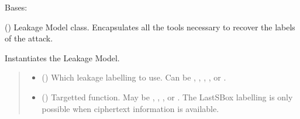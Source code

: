 \documentclass[letterpaper,10pt,english]{sphinxmanual}
\begin{document}
\begin{fulllineitems}
\label{\detokenize{MLSCAlib.Ciphers:MLSCAlib.Ciphers.AES_leakage.AESLeakageModel}}
\pysigstartsignatures
{}
\pysigstopsignatures
\sphinxAtStartPar
Bases: 

\sphinxAtStartPar
{} () Leakage Model class. Encapsulates all the tools necessary to recover the labels of the attack.

\begin{fulllineitems}
\label{\detokenize{MLSCAlib.Ciphers:MLSCAlib.Ciphers.AES_leakage.AESLeakageModel.__init__}}
\pysigstartsignatures
{}
\pysigstopsignatures
\sphinxAtStartPar
Instantiates the  Leakage Model.
\begin{quote}\begin{description}
\begin{itemize}
\item {} 
\sphinxAtStartPar
{} () \textendash{} Which leakage labelling to use. Can be , , , ,  or .

\item {} 
\sphinxAtStartPar
{} () \textendash{} Targetted  function. May be , , , or .
The LastSBox labelling is only possible when ciphertext information is
available.


\end{itemize}
\end{description}
\end{quote}
\end{fulllineitems}
\end{fulllineitems}
\end{document}
